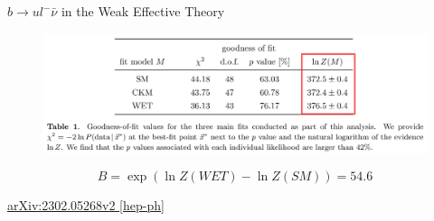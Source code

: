 \documentclass[
aspectratio=169,
14pt,
professionalfonts
]{beamer}
\begin{document}
\begin{frame}{$b\to u l^- \bar \nu$ in the Weak Effective Theory}
    \begin{figure}
        \centering
        \includegraphics[width=\textwidth]{../plots/wet-bayes.png}
    \end{figure}
    $$
    B = \exp(\ln Z(WET) - \ln Z (SM)) = 54.6
    $$
    \begin{flushright}
        \small
        \href{https://arxiv.org/pdf/2302.05268}{arXiv:2302.05268v2 [hep-ph]}
    \end{flushright}
\end{frame}






\end{document}
